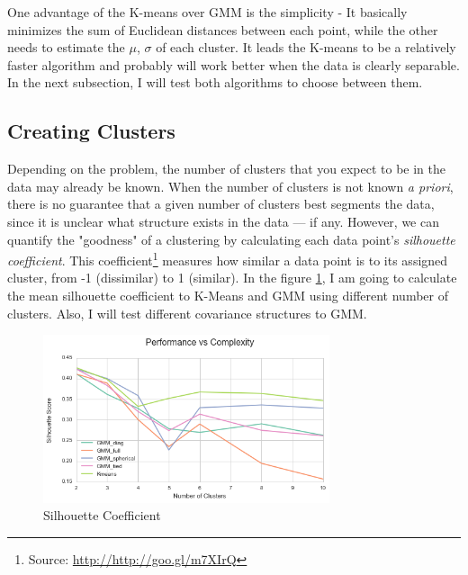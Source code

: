 \documentclass[a4paper]{article}
\begin{document}
One advantage of the K-means over GMM is the simplicity -  It basically minimizes the sum of Euclidean distances between each point, while the other needs to estimate the $\mu$, $\sigma$ of each cluster. It leads the K-means to be a relatively faster algorithm and probably will work better when the data is clearly separable. In the next subsection, I will test both algorithms to choose between them.

\subsection{Creating Clusters}

Depending on the problem, the number of clusters that you expect to be in the data may already be known. When the number of clusters is not known \textit{a priori}, there is no guarantee that a given number of clusters best segments the data, since it is unclear what structure exists in the data — if any. However, we can quantify the "goodness" of a clustering by calculating each data point's \textit{silhouette coefficient}. This coefficient\footnote{Source: \url{http://http://goo.gl/m7XIrQ}} measures how similar a data point is to its assigned cluster, from -1 (dissimilar) to 1 (similar). In the figure \ref{fig:silhouette}, I am going to calculate the mean silhouette coefficient to K-Means and GMM using different number of clusters. Also, I will test different covariance structures to GMM.

\begin{figure}[ht!]
\centering
\includegraphics[width=0.75\textwidth]{figures/silhouette_score.png}
\caption{\label{fig:silhouette}Silhouette Coefficient}
\end{figure}
\end{document}
